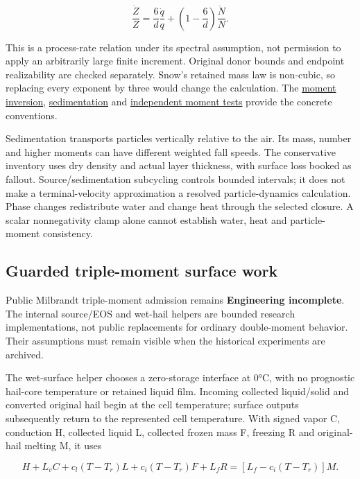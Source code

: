 \documentclass[
  11pt,
]{report}
\begin{document}
\[\frac{\dot Z}{Z}=\frac{6}{d}\frac{\dot q}{q}
+\left(1-\frac{6}{d}\right)\frac{\dot N}{N}.\]

This is a process-rate relation under its spectral assumption, not
permission to apply an arbitrarily large finite increment. Original
donor bounds and endpoint realizability are checked separately. Snow's
retained mass law is non-cubic, so replacing every exponent by three
would change the calculation. The
\href{../src/microphysics/schemes/milbrandt/triple_moment.cpp}{moment
inversion},
\href{../src/microphysics/schemes/milbrandt/triple_sedimentation.cpp}{sedimentation}
and
\href{../tests/physics/test_milbrandt_triple_moment_candidate.cpp}{independent
moment tests} provide the concrete conventions.

Sedimentation transports particles vertically relative to the air. Its
mass, number and higher moments can have different weighted fall speeds.
The conservative inventory uses dry density and actual layer thickness,
with surface loss booked as fallout. Source/sedimentation subcycling
controls bounded intervals; it does not make a terminal-velocity
approximation a resolved particle-dynamics calculation. Phase changes
redistribute water and change heat through the selected closure. A
scalar nonnegativity clamp alone cannot establish water, heat and
particle-moment consistency.

\subsection{Guarded triple-moment surface
work}\label{guarded-triple-moment-surface-work}

Public Milbrandt triple-moment admission remains \textbf{Engineering
incomplete}. The internal source/EOS and wet-hail helpers are bounded
research implementations, not public replacements for ordinary
double-moment behavior. Their assumptions must remain visible when the
historical experiments are archived.

The wet-surface helper chooses a zero-storage interface at 0°C, with no
prognostic hail-core temperature or retained liquid film. Incoming
collected liquid/solid and converted original hail begin at the cell
temperature; surface outputs subsequently return to the represented cell
temperature. With signed vapor C, conduction H, collected liquid L,
collected frozen mass F, freezing R and original-hail melting M, it uses

\[H+L_vC+c_l(T-T_r)L+c_i(T-T_r)F+L_fR
=[L_f-c_i(T-T_r)]M.\]
\end{document}
